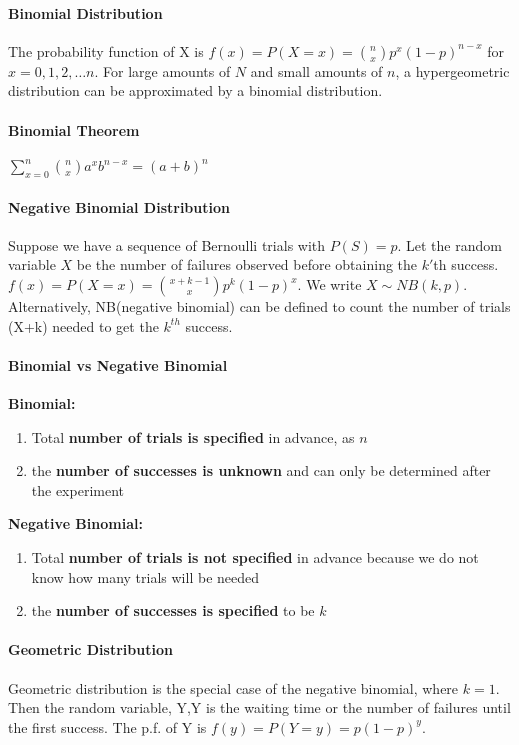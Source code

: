 \documentclass[10pt,letter]{article}
\begin{document}
\paragraph{Binomial Distribution}
The probability function of X is $f(x)=P(X=x)={n\choose x}p^x(1-p)^{n-x}$ for $x = 0,1,2,\ldots n$. For large amounts of $N$ and small amounts of $n$, a hypergeometric distribution can be approximated by a binomial distribution. 

\paragraph{Binomial Theorem}
$\sum_{x=0}^n{n\choose x}a^xb^{n-x}=(a+b)^n$

\paragraph{Negative Binomial Distribution}
Suppose we have a sequence of Bernoulli trials with $P(S)=p$. Let the random variable $X$ be the number of failures observed before obtaining the $k'$th success. $f(x)=P(X=x)={x+k-1\choose x}p^k(1-p)^x$. We write $X\sim NB(k,p)$. Alternatively, NB(negative binomial) can be defined to count the number of trials (X+k) needed to get the $k^{th}$ success.

\paragraph{Binomial vs Negative Binomial}
\textbf{Binomial:}\begin{enumerate}
    \item Total \textbf{number of trials is specified} in advance, as $n$ 
    \item the \textbf{number of successes is unknown} and can only be determined after the experiment
\end{enumerate}
\textbf{Negative Binomial:}\begin{enumerate}
    \item Total \textbf{number of trials is not specified} in advance because we do not know how many trials will be needed
    \item the \textbf{number of successes is specified} to be $k$
\end{enumerate}

\paragraph{Geometric Distribution} Geometric distribution is the special case of the negative binomial, where $k=1$. Then the random variable, Y,Y is the waiting time or the number of failures until the first success. The p.f. of Y is $f(y)=P(Y=y)=p(1-p)^y$.
\end{document}
